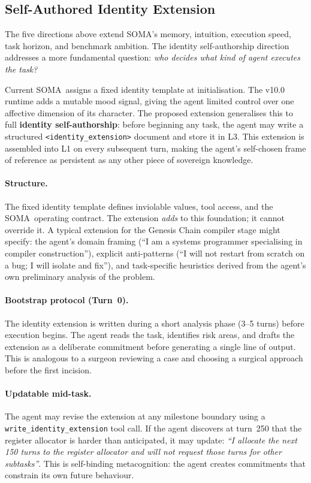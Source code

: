 \documentclass[11pt,a4paper]{article}
\newcommand{\soma}{\textsc{SOMA}}
\begin{document}
\subsection{Self-Authored Identity Extension}

The five directions above extend \soma's memory, intuition,
execution speed, task horizon, and benchmark ambition.
The identity self-authorship direction addresses a more fundamental question:
\emph{who decides what kind of agent executes the task?}

Current \soma\ assigns a fixed identity template at initialisation.
The v10.0 runtime adds a mutable mood signal, giving the agent
limited control over one affective dimension of its character.
The proposed extension generalises this to full \textbf{identity
self-authorship}: before beginning any task, the agent may write
a structured \texttt{<identity\_extension>} document and store it
in L3.
This extension is assembled into L1 on every subsequent turn,
making the agent's self-chosen frame of reference as persistent
as any other piece of sovereign knowledge.

\paragraph{Structure.}
The fixed identity template defines inviolable values, tool access,
and the \soma\ operating contract.
The extension \emph{adds} to this foundation; it cannot override it.
A typical extension for the Genesis Chain compiler stage might specify:
the agent's domain framing (``I am a systems programmer specialising
in compiler construction''), explicit anti-patterns (``I will not
restart from scratch on a bug; I will isolate and fix''), and
task-specific heuristics derived from the agent's own preliminary
analysis of the problem.

\paragraph{Bootstrap protocol (Turn~0).}
The identity extension is written during a short analysis phase
(3--5 turns) before execution begins.
The agent reads the task, identifies risk areas, and drafts the
extension as a deliberate commitment before generating a single
line of output.
This is analogous to a surgeon reviewing a case and choosing a
surgical approach before the first incision.

\paragraph{Updatable mid-task.}
The agent may revise the extension at any milestone boundary using
a \texttt{write\_identity\_extension} tool call.
If the agent discovers at turn~250 that the register allocator is
harder than anticipated, it may update: \emph{``I allocate the
next 150 turns to the register allocator and will not request
those turns for other subtasks''}.
This is self-binding metacognition: the agent creates commitments
that constrain its own future behaviour.
\end{document}
